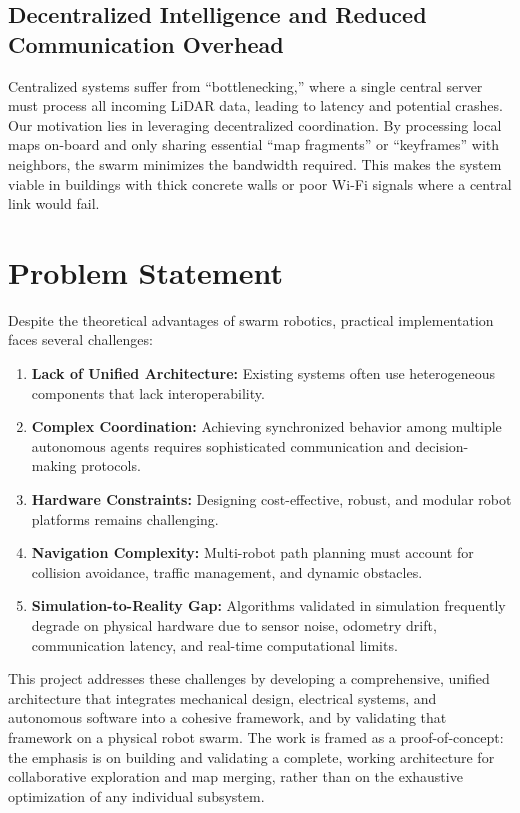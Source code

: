 \subsection{Decentralized Intelligence and Reduced Communication Overhead}
Centralized systems suffer from ``bottlenecking,'' where a single central server must process all incoming LiDAR data, leading to latency and potential crashes. Our motivation lies in leveraging decentralized coordination. By processing local maps on-board and only sharing essential ``map fragments'' or ``keyframes'' with neighbors, the swarm minimizes the bandwidth required. This makes the system viable in buildings with thick concrete walls or poor Wi-Fi signals where a central link would fail.

\section{Problem Statement}
\label{sec:problem_statement}

Despite the theoretical advantages of swarm robotics, practical implementation faces several challenges:

\begin{enumerate}
    \item \textbf{Lack of Unified Architecture:} Existing systems often use heterogeneous components that lack interoperability.
    \item \textbf{Complex Coordination:} Achieving synchronized behavior among multiple autonomous agents requires sophisticated communication and decision-making protocols.
    \item \textbf{Hardware Constraints:} Designing cost-effective, robust, and modular robot platforms remains challenging.
    \item \textbf{Navigation Complexity:} Multi-robot path planning must account for collision avoidance, traffic management, and dynamic obstacles.
    \item \textbf{Simulation-to-Reality Gap:} Algorithms validated in simulation frequently degrade on physical hardware due to sensor noise, odometry drift, communication latency, and real-time computational limits.
\end{enumerate}

This project addresses these challenges by developing a comprehensive, unified architecture that integrates mechanical design, electrical systems, and autonomous software into a cohesive framework, and by validating that framework on a physical robot swarm. The work is framed as a proof-of-concept: the emphasis is on building and validating a complete, working architecture for collaborative exploration and map merging, rather than on the exhaustive optimization of any individual subsystem.

